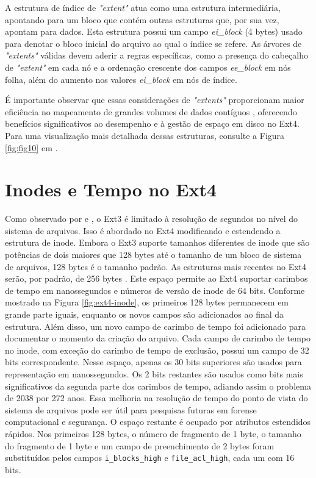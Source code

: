 \documentclass[
	12pt,				%
	openright,			%
	oneside,			%
	a4paper,			%
	chapter=TITLE,		%
	english,			%
	french,				%
	spanish,			%
	brazil				%
	]{abntex2}
\theoremstyle{definition}
\begin{document}
A estrutura de índice 
de \textit{"extent"} atua como uma estrutura intermediária, apontando para um bloco que 
contém outras estruturas que, por sua vez, apontam para dados. Esta estrutura possui um campo
\textit{ei\_block} (4 bytes) usado para denotar o bloco inicial do arquivo ao qual o índice se 
refere. As árvores de \textit{"extents"} válidas devem aderir a regras específicas, 
como a presença do cabeçalho de \textit{"extent"} em cada nó e a ordenação crescente dos 
campos \textit{ee\_block} em nós folha, além do aumento nos valores \textit{ei\_block} em nós de índice.

É importante observar que essas considerações de \textit{"extents"} proporcionam maior eficiência 
no mapeamento de grandes volumes de dados contíguos \cite{carrier2005file}, oferecendo benefícios significativos ao 
desempenho e à gestão de espaço em disco no Ext4. Para uma visualização mais detalhada dessas 
estruturas, consulte a Figura \ref{fig:fig10} em \cite{matur}.

\section{Inodes e Tempo no Ext4}

Como observado por \cite{matur} e \cite{xia}, o Ext3 é limitado à resolução de segundos 
no nível do sistema de arquivos. Isso é abordado no Ext4 modificando e estendendo a estrutura de 
inode. Embora o Ext3 suporte tamanhos diferentes de inode que são potências de dois maiores que 128 
bytes até o tamanho de um bloco de sistema de arquivos, 128 bytes é o tamanho padrão. As estruturas 
mais recentes no Ext4 serão, por padrão, de 256 bytes \cite{matur}. Este espaço permite ao 
Ext4 suportar carimbos de tempo em nanossegundos e números de versão de inode de 64 bits. 
Conforme mostrado na Figura \ref{fig:ext4-inode}, os primeiros 128 bytes permanecem em 
grande parte iguais, enquanto os novos campos são adicionados ao final da estrutura. 
Além disso, um novo campo de carimbo de tempo foi adicionado para documentar o momento 
da criação do arquivo. Cada campo de carimbo de tempo no inode, com exceção do carimbo de tempo de 
exclusão, possui um campo de 32 bits correspondente. Nesse espaço, apenas os 30 bits superiores são 
usados para representação em nanossegundos. Os 2 bits restantes são usados como bits mais significativos 
da segunda parte dos carimbos de tempo, adiando assim o problema de 2038 por 272 anos. 
Essa melhoria na resolução de tempo do ponto de vista do sistema de arquivos pode ser 
útil para pesquisas futuras em forense computacional e segurança. O espaço restante é 
ocupado por atributos estendidos rápidos. Nos primeiros 128 bytes, o número de fragmento 
de 1 byte, o tamanho do fragmento de 1 byte e um campo de preenchimento de 2 bytes foram 
substituídos pelos campos \texttt{i\_blocks\_high} e \texttt{file\_acl\_high}, cada um com 16 bits.
\end{document}
